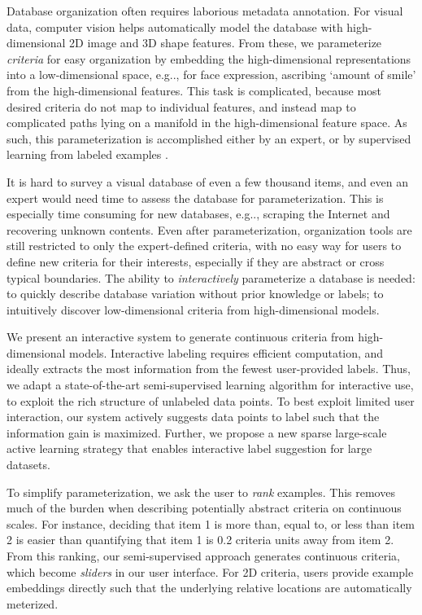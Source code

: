 \documentclass{article}
\makeatletter
\DeclareRobustCommand\onedot{\futurelet\@let@token\@onedot}
\def\@onedot{\ifx\@let@token.\else.\null\fi\xspace}
\def\eg{{e.g}\onedot} \def\Eg{{E.g}\onedot}
\makeatother
\begin{document}
Database organization often requires laborious metadata annotation. For visual data, computer vision helps automatically model the database with high-dimensional 2D image and 3D shape features. From these, we parameterize \emph{criteria} for easy organization by embedding the high-dimensional representations into a low-dimensional space, \eg, for face expression, ascribing `amount of smile' from the high-dimensional features. This task is complicated, because most desired criteria do not map to individual features, and instead map to complicated paths lying on a manifold in the high-dimensional feature space. As such, this parameterization is accomplished either by an expert, or by supervised learning from labeled examples \cite{ParGra11,ChenBennett2013}.

It is hard to survey a visual database of even a few thousand items, and even an expert would need time to assess the database for parameterization. This is especially time consuming for new databases, \eg, scraping the Internet and recovering unknown contents. Even after parameterization, organization tools are still restricted to only the expert-defined criteria, with no easy way for users to define new criteria for their interests, especially if they are abstract or cross typical boundaries. The ability to \emph{interactively} parameterize a database is needed: to quickly describe database variation without prior knowledge or labels; to intuitively discover low-dimensional criteria from high-dimensional models.

We present an interactive system to generate continuous criteria from high-dimensional models. Interactive labeling requires efficient computation, and ideally extracts the most information from the fewest user-provided labels. Thus, we adapt a state-of-the-art semi-supervised learning algorithm for interactive use, to exploit the rich structure of unlabeled data points. To best exploit limited user interaction, our system actively suggests data points to label such that the information gain is maximized. Further, we propose a new sparse large-scale active learning strategy that enables interactive label suggestion for large datasets.

To simplify parameterization, we ask the user to \emph{rank} examples. This removes much of the burden when describing potentially abstract criteria on continuous scales. For instance, deciding that item 1 is more than, equal to, or less than item 2 is easier than quantifying that item 1 is 0.2 criteria units away from item 2. From this ranking, our semi-supervised approach generates continuous criteria, which become \emph{sliders} in our user interface. For 2D criteria, users provide example embeddings directly such that the underlying relative locations are automatically meterized.
\end{document}
